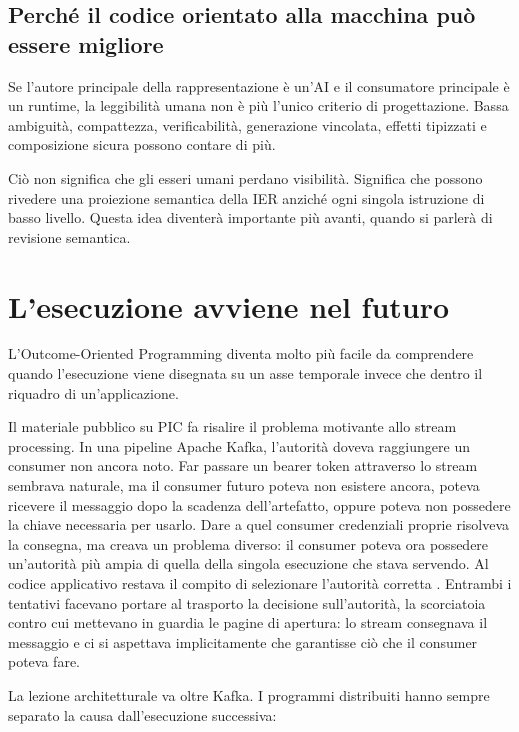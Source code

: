 \documentclass[10pt,oneside,openany]{book}
\begin{document}
\section{Perché il codice orientato alla macchina può essere migliore}
Se l'autore principale della rappresentazione è un'AI e il consumatore principale è un runtime, la leggibilità umana non è più l'unico criterio di progettazione. Bassa ambiguità, compattezza, verificabilità, generazione vincolata, effetti tipizzati e composizione sicura possono contare di più.

Ciò non significa che gli esseri umani perdano visibilità. Significa che possono rivedere una proiezione semantica della IER anziché ogni singola istruzione di basso livello. Questa idea diventerà importante più avanti, quando si parlerà di revisione semantica.


\chapter{L'esecuzione avviene nel futuro}

L'Outcome-Oriented Programming diventa molto più facile da comprendere quando l'esecuzione viene disegnata su un asse temporale invece che dentro il riquadro di un'applicazione.

Il materiale pubblico su PIC fa risalire il problema motivante allo stream processing. In una pipeline Apache Kafka, l'autorità doveva raggiungere un consumer non ancora noto. Far passare un bearer token attraverso lo stream sembrava naturale, ma il consumer futuro poteva non esistere ancora, poteva ricevere il messaggio dopo la scadenza dell'artefatto, oppure poteva non possedere la chiave necessaria per usarlo. Dare a quel consumer credenziali proprie risolveva la consegna, ma creava un problema diverso: il consumer poteva ora possedere un'autorità più ampia di quella della singola esecuzione che stava servendo. Al codice applicativo restava il compito di selezionare l'autorità corretta \cite{picwhy}. Entrambi i tentativi facevano portare al trasporto la decisione sull'autorità, la scorciatoia contro cui mettevano in guardia le pagine di apertura: lo stream consegnava il messaggio e ci si aspettava implicitamente che garantisse ciò che il consumer poteva fare.

La lezione architetturale va oltre Kafka. I programmi distribuiti hanno sempre separato la causa dall'esecuzione successiva:
\end{document}
